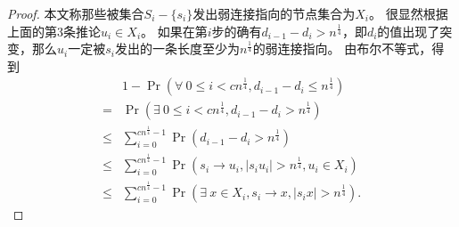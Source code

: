 \begin{proof}
本文称那些被集合$S_{i} - \{s_i\}$发出弱连接指向的节点集合为$X_i$。
很显然根据上面的第3条推论$u_i \in X_i$。
如果在第$i$步的确有$d_{i-1}-d_{i}> n^{\frac{1}{4}}$，即$d_i$的值出现了突变，那么$u_i$一定被$s_i$发出的一条长度至少为$n^{\frac{1}{4}}$的弱连接指向。
由布尔不等式，得到
\begin{equation}
\begin{array}{ll}
& 1- \Pr(\forall~0 \leq i < cn^{\frac{1}{4}}, d_{i-1}-d_{i}\leq n^{\frac{1}{4}})\\
= & \Pr(\exists~0 \leq i < cn^{\frac{1}{4}}, d_{i-1}-d_{i}> n^{\frac{1}{4}}) \\
\leq & \sum_{i=0}^{cn^{\frac{1}{4}}-1}\Pr(d_{i-1}-d_{i}> n^{\frac{1}{4}}) \\
\leq & \sum_{i=0}^{cn^{\frac{1}{4}}-1}\Pr(s_i \to u_i , |s_iu_i| > n^{\frac{1}{4}} , u_i \in X_i) \\
\leq & \sum_{i=0}^{cn^{\frac{1}{4}}-1}\Pr(\exists~x \in X_i, s_i \to x, |s_ix| > n^{\frac{1}{4}}).
\end{array}
\label{eq:routing}
\end{equation}


\end{proof}
